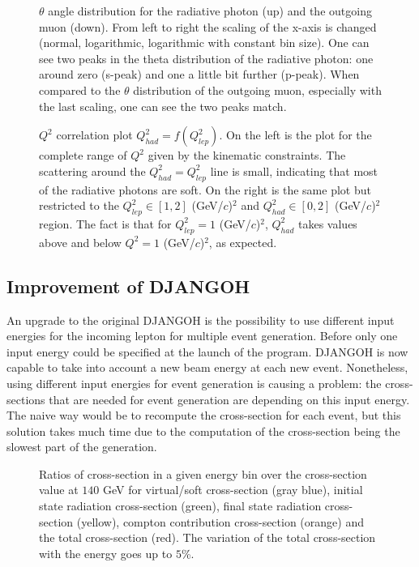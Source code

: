 \begin{figure}[htb]
\centerline{}
\caption{$\theta$ angle distribution for the radiative photon (up) and the outgoing muon (down). From left to right the scaling of the x-axis is changed (normal, logarithmic, logarithmic with constant bin size). One can see two peaks in the theta distribution of the radiative photon: one around zero (s-peak) and one a little bit further (p-peak). When compared to the $\theta$ distribution of the outgoing muon, especially with the last scaling, one can see the two peaks match.}\label{fig:anglesp}
 \end{figure}
\hfill
\begin{figure}[htb]
\centerline{}
\caption{$Q^2$ correlation plot $Q^2_{had}=f(Q^2_{lep})$. On the left is the plot for the complete range of $Q^2$
given by the kinematic constraints. The scattering around the $Q^2_{had} = Q^2_{lep}$ line is small, indicating that
most of the radiative photons are soft. On the right is the same plot but restricted to the $Q^2_{lep}\in[1,2]$ (GeV/$c$)$^2$ and
$Q^2_{had}\in[0,2]$ (GeV/$c$)$^2$ region. The fact is that for $Q^2_{lep}=1$ (GeV/$c$)$^2$, $Q^2_{had}$ takes values above and below $Q^2=1$ (GeV/$c$)$^2$, as expected.}\label{fig:Q2corr}
\end{figure}

\subsection{Improvement of DJANGOH}

An upgrade to the original DJANGOH is the possibility to use different input energies for the incoming lepton for multiple event generation. Before only one input energy could be specified at the launch of the program. DJANGOH is now capable to take into account a new beam energy at each new event. Nonetheless, using different input energies for event generation is causing a problem: the cross-sections that are needed for event generation are depending on this input energy. The naive way would be to recompute the cross-section for each event, but this solution takes much time due to the computation of the cross-section being the slowest part of the generation.

\begin{figure}[htb]
\centerline{}
\caption{Ratios of cross-section in a given energy bin over the cross-section value at $140$ GeV for virtual/soft cross-section (gray blue), initial state radiation cross-section (green), final state radiation cross-section (yellow), compton contribution cross-section (orange) and the total cross-section (red). The variation of the total cross-section with the energy goes up to $5$\%.}\label{fig:gridxs}
\end{figure}

